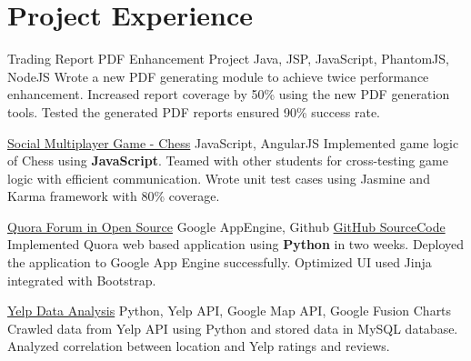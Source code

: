 \documentclass[11pt,a4paper,sans]{moderncv}   %
\begin{document}
\section{Project Experience}
\renewcommand{\baselinestretch}{1.25}

{Trading Report PDF Enhancement Project}
{Java, JSP, JavaScript, PhantomJS, NodeJS}
{}{}
{
	{Wrote a new PDF generating module to achieve twice performance enhancement.}
	\newline
	{Increased report coverage by 50\% using the new PDF generation tools.}
	\newline
	{Tested the generated PDF reports ensured 90\% success rate.}
}

{\href{https://github.com/cz764/Chess}{Social Multiplayer Game - Chess}}
{JavaScript, AngularJS}
{}{}
{
	{Implemented game logic of Chess using \textbf{JavaScript}.}
	\newline
	{Teamed with other students for cross-testing game logic with efficient communication.}
	\newline
	{Wrote unit test cases using Jasmine and Karma framework with 80\% coverage.}
}

{\href{http://chenzhuost.appspot.com/}{Quora Forum in Open Source}}
{Google AppEngine, Github}
{\href{https://github.com/cz764/OpenSourceTool_FinalProject}{GitHub SourceCode}}{}
{
	{Implemented Quora web based application using \textbf{Python} in two weeks.}
	\newline
	{Deployed the application to Google App Engine successfully.}
	\newline
	{Optimized UI used Jinja integrated with Bootstrap.}
}



{\href{https://github.com/cz764/DealingWithData_FinalProject}{Yelp Data Analysis}}
{Python, Yelp API, Google Map API, Google Fusion Charts}
{}{}
{
	{Crawled data from Yelp API using Python and stored data in MySQL database.}
	\newline
	{Analyzed correlation between location and Yelp ratings and reviews.}
}


\end{document}
